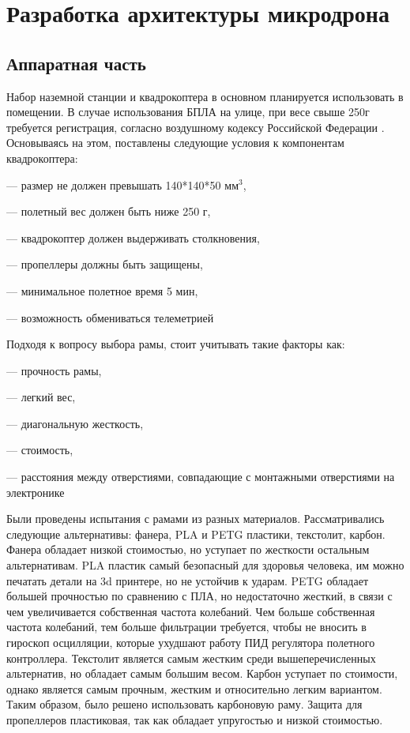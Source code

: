 
\section{Разработка архитектуры микродрона}
\subsection{Аппаратная часть}

Набор наземной станции и квадрокоптера в основном планируется использовать в помещении. В случае использования БПЛА на улице, при весе свыше 250г требуется регистрация, согласно воздушному кодексу Российской Федерации\cite{ivp} . Основываясь на этом, поставлены следующие условия к компонентам квадрокоптера:

--- размер не должен превышать 140*140*50 \(мм^3\),

--- полетный вес должен быть ниже 250 г,

--- квадрокоптер должен выдерживать столкновения,

--- пропеллеры должны быть защищены,

--- минимальное полетное время 5 мин,

--- возможность обмениваться телеметрией

Подходя к вопросу выбора рамы, стоит учитывать такие факторы как:

--- прочность рамы,

--- легкий вес,

--- диагональную жесткость,

--- стоимость,

--- расстояния между отверстиями, совпадающие с монтажными отверстиями на электронике

Были проведены испытания с рамами из разных материалов. Рассматривались следующие альтернативы: фанера, PLA и PETG пластики, текстолит, карбон. Фанера обладает низкой стоимостью, но уступает по жесткости остальным альтернативам. PLA пластик самый безопасный для здоровья человека, им можно печатать детали на 3d принтере, но не устойчив к ударам. PETG обладает большей прочностью по сравнению с ПЛА, но недостаточно жесткий, в связи с чем увеличивается собственная частота колебаний. Чем больше собственная частота колебаний, тем больше фильтрации требуется, чтобы не вносить в гироскоп осцилляции, которые ухудшают работу ПИД регулятора полетного контроллера. Текстолит является самым жестким среди вышеперечисленных альтернатив, но обладает самым большим весом. Карбон уступает по стоимости, однако является самым прочным, жестким и относительно легким вариантом. Таким образом, было решено использовать карбоновую раму.
Защита для пропеллеров пластиковая, так как обладает упругостью и низкой стоимостью.

